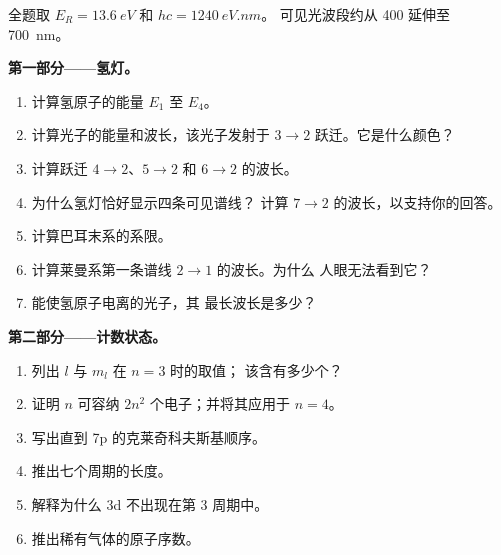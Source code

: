 \begin{problem}
\label{pb:b1:quantum-numbers:1}
全题取 $E_R = \qty{13.6}{eV}$ 和 $hc = \qty{1240}{eV.nm}$。
可见光波段约从 400 延伸至 \qty{700}{nm}。

\medskip
\noindent\textbf{第一部分——氢灯。}
\begin{enumerate}
  \item 计算氢原子的能量 $E_1$ 至 $E_4$。
  \item 计算光子的能量和波长，该光子发射于
        $3 \to 2$ 跃迁。它是什么颜色？
  \item 计算跃迁 $4 \to 2$、$5 \to 2$
        和 $6 \to 2$ 的波长。
  \item 为什么氢灯恰好显示四条可见谱线？
        计算 $7 \to 2$ 的波长，以支持你的回答。
  \item 计算巴耳末系的系限。
  \item 计算莱曼系第一条谱线 $2 \to 1$ 的波长。为什么
        人眼无法看到它？
  \item 能使氢原子电离的光子，其
        最长波长是多少？
\end{enumerate}

\medskip
\noindent\textbf{第二部分——计数状态。}
\begin{enumerate}[resume]
  \item 列出 $l$ 与 $m_l$ 在 $n = 3$ 时的取值；
        该含有多少个？
  \item 证明 $n$ 可容纳 $2n^2$ 个电子；并将其应用于 $n = 4$。
  \item 写出直到 7p 的克莱奇科夫斯基顺序。
  \item 推出七个周期的长度。
  \item 解释为什么 3d 不出现在第 3 周期中。
  \item 推出稀有气体的原子序数。
\end{enumerate}


\end{problem}
